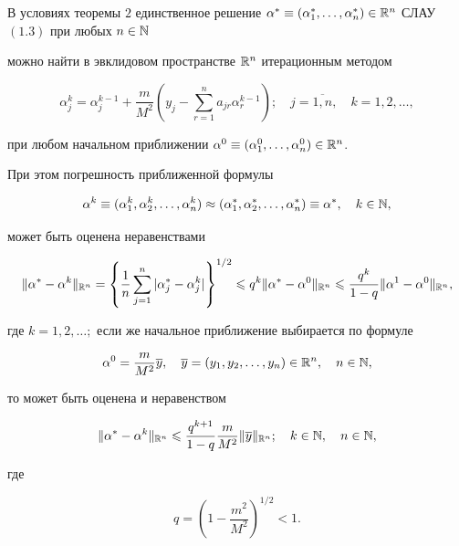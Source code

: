\begin{thm}


В условиях теоремы $2$ единственное решение $\alpha^*\equiv


(\alpha^*_1,\dotsc,\alpha^*_n) \in \R^n$ СЛАУ $(1.3)$ при любых $n\in \N$


можно найти в эвклидовом пространстве $\Bbb R^n$ итерационным методом


\begin{equation}


\alpha^k_j=\alpha^{k-1}_j+\frac{m}{M^2}\left(y_j-


\sum\limits^{n}_{r=1}a_{jr}\alpha^{k-1}_r\right); \quad j=\overline{1,n},


\quad k=1,2,\dotsc,


\end{equation}


при любом начальном приближении $\alpha^0\equiv


(\alpha^0_1,\dotsc,\alpha^0_n)\in \R^n$.


При этом погрешность приближенной формулы


$$


\alpha^k\equiv (\alpha^k_1,\alpha^k_2,\dotsc,\alpha^k_n)


\approx(\alpha^*_1,\alpha^*_2,\dotsc,\alpha^*_n)\equiv \alpha^*, \quad k\in


\N,


$$


может быть оценена неравенствами


$$


\|\alpha^*-\alpha^k\|_{\R^n}=\left\{\frac{1}{n}


\sum\limits^n_{j=1}|\alpha^*_j-\alpha^k_j|\right\}^{1/2}\lea


q^k\|\alpha^*-\alpha^0\|_{\R^n}\lea\frac{q^k}{1-q}\|\alpha^1-


\alpha^0\|_{\R^n},


$$


где $k=1,2,\dotsc;$ если же начальное приближение выбирается по формуле


$$


\alpha^0=\frac{m}{M^2}\overline{y}, \quad


\overline{y}=(y_1,y_2,\dotsc,y_n)\in \R^n,\quad n\in \N,


$$


то может быть оценена и неравенством


$$


\|\alpha^*-\alpha^k\|_{\R^n}\lea\frac{q^{k+1}}{1-


q}\frac{m}{M^2}\|\overline{y}\|_{\R^n}; \quad k\in \N,\quad n\in \N,


$$


где


\begin{equation}


q=\left(1-\frac{m^2}{M^2}\right)^{1/2}<1.


\end{equation}


\end{thm}





